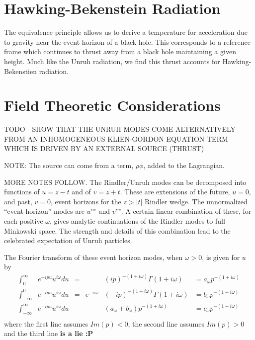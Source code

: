 \documentclass[12pt,a4paper]{article}
\begin{document}
\section{Hawking-Bekenstein Radiation}

The equivalence principle allows us to derive a temperature for acceleration due to gravity near the event horizon of a black hole.  This corresponds to a reference frame which continues to thrust away from a black hole maintaining a given height.  Much like the Unruh radiation, we find this thrust accounts for Hawking-Bekenstien radiation.

\section{Field Theoretic Considerations}
TODO - SHOW THAT THE UNRUH MODES COME ALTERNATIVELY FROM AN INHOMOGENEOUS KLIEN-GORDON EQUATION TERM WHICH IS DRIVEN BY AN EXTERNAL SOURCE (THRUST)
\cite{beisert}


NOTE: The source can come from a term, $\rho \phi$, added to the Lagrangian.


MORE NOTES FOLLOW. The Rindler/Unruh modes can be decomposed into functions of $u = z-t$ and of $v = z+t$.  These are extensions of the future, $u=0$, and past, $v=0$, event horizons for the $z>|t|$ Rindler wedge.  The unnormalized ``event horizon'' modes are $u^{iw}$ and $v^{iw}$. A certain linear combination of these, for each positive $\omega$, gives analytic continuations of the Rindler modes to full Minkowski space.  The strength and details of this combination lead to the celebrated expectation of Unruh particles.

The Fourier transform of these event horizon modes, when $\omega > 0$, is given for $u$ by
\[
\begin{aligned}
\int_0^\infty         & e^{-i p u} u^{i\omega} du &=&             &(i p)^{-(1 + i\omega)}\Gamma(1 + i\omega)              & = a_\omega p^{-(1 + i\omega)} \\
\int_{-\infty}^0       & e^{-i p u} u^{i\omega} du &=& e^{-\pi\omega}&(-i p)^{-(1 + i\omega)}\Gamma(1 + i\omega) & = b_\omega p^{-(1 + i\omega)} \\
\int_{-\infty}^\infty   & e^{-i p u} u^{i\omega} du & &            & (a_\omega + b_\omega) p^{-(1 + i\omega)}               & = c_\omega p^{-(1 + i\omega)} \\
\end{aligned}
\]
where the first line assumes $Im(p) < 0$, the second line assumes $Im(p) > 0$ and the third line {\bf is a lie :P}
\end{document}
